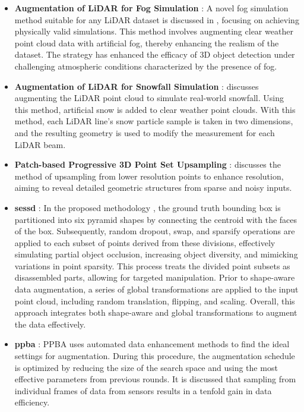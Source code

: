 \begin{itemize}
    \item \textbf{Augmentation of LiDAR for Fog Simulation} : A novel fog simulation method suitable for any LiDAR dataset is discussed in \parencite{fog_sim_2021}, focusing on achieving physically valid simulations. This method involves augmenting clear weather point cloud data with artificial fog, thereby enhancing the realism of the dataset. The strategy has enhanced the efficacy of 3D object detection under challenging atmospheric conditions characterized by the presence of fog.
    \item \textbf{Augmentation of LiDAR for Snowfall Simulation} :\parencite{snow_sim_2022} discusses augmenting the LiDAR point cloud to simulate real-world snowfall. Using this method, artificial snow is added to clear weather point clouds. With this method, each LiDAR line's snow particle sample is taken in two dimensions, and the resulting geometry is used to modify the measurement for each LiDAR beam.
    \item \textbf{Patch-based Progressive 3D Point Set Upsampling} :  \parencite{patched_up_2018} discusses the method of upsampling from lower resolution points to enhance resolution, aiming to reveal detailed geometric structures from sparse and noisy inputs.
    \item \textbf{\acrfull{sessd}} : In the proposed methodology \parencite{sessd_2021}, the ground truth bounding box is partitioned into six pyramid shapes by connecting the centroid with the faces of the box. Subsequently, random dropout, swap, and sparsify operations are applied to each subset of points derived from these divisions, effectively simulating partial object occlusion, increasing object diversity, and mimicking variations in point sparsity. This process treats the divided point subsets as disassembled parts, allowing for targeted manipulation. Prior to shape-aware data augmentation, a series of global transformations are applied to the input point cloud, including random translation, flipping, and scaling. Overall, this approach integrates both shape-aware and global transformations to augment the data effectively.
    \item \textbf{\acrfull{ppba}} : PPBA \parencite{ppba_2020} uses automated data enhancement methods to find the ideal settings for augmentation. During this procedure, the augmentation schedule is optimized by reducing the size of the search space and using the most effective parameters from previous rounds. It is discussed that sampling from individual frames of data from sensors results in a tenfold gain in data efficiency.

\end{itemize}
